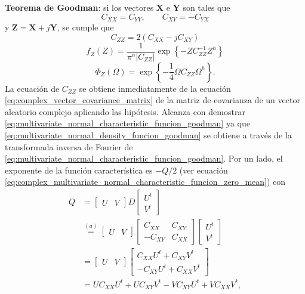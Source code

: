 \documentclass[a4paper]{report}
\newcommand{\X}{\mathbf{X}}
\newcommand{\Y}{\mathbf{Y}}
\newcommand{\Z}{\mathbf{Z}}
\begin{document}
\textbf{Teorema de Goodman}: si los vectores \(\X\) e \(\Y\) son tales que
\[
 C_{XX}=C_{YY}, \qquad C_{XY}=-C_{YX}
\]
y \(\Z=\X+j\Y\), se cumple que
\[
 C_{ZZ}=2(C_{XX}-jC_{XY})
\]
\begin{equation}\label{eq:multivariate_normal_density_funcion_goodman}
 f_Z(Z)=\frac{1}{\pi^n|C_{ZZ}|}\exp\left\{-ZC_{ZZ}^{-1}Z^h\right\}
\end{equation}
\begin{equation}\label{eq:multivariate_normal_characteristic_funcion_goodman}
 \Phi_Z(\Omega)=\exp\left\{-\frac{1}{4}\Omega C_{ZZ}\Omega^h\right\}.
\end{equation}
La ecuación de \(C_{ZZ}\) se obtiene inmediatamente de la ecuación \ref{eq:complex_vector_covariance_matrix} de la matriz de covarianza de un vector aleatorio complejo aplicando las hipótesis.
Alcanza con demostrar \ref{eq:multivariate_normal_characteristic_funcion_goodman} ya que \ref{eq:multivariate_normal_density_funcion_goodman} se obtiene a través de la transformada inversa de Fourier de \ref{eq:multivariate_normal_characteristic_funcion_goodman}. Por un lado, el exponente de la función característica es \(-Q/2\) (ver ecuación \ref{eq:complex_multivariate_normal_characteristic_funcion_zero_mean}) con 
\begin{align*}
 Q&=\begin{bmatrix}
   U & V
 \end{bmatrix}
 D
 \begin{bmatrix}
   U^t\\
   V^t
 \end{bmatrix}\\
 &\overset{(a)}{=}\begin{bmatrix}
   U & V
 \end{bmatrix}
 \begin{bmatrix}
   C_{XX} & C_{XY} \\
   -C_{XY} & C_{XX}
 \end{bmatrix}
 \begin{bmatrix}
   U^t\\
   V^t
 \end{bmatrix}\\
 &=\begin{bmatrix}
   U & V
  \end{bmatrix}
  \begin{bmatrix}
   C_{XX}U^t+C_{XY}V^t\\
   -C_{XY}U^t+C_{XX}V^t
  \end{bmatrix}\\
 &=UC_{XX}U^t+UC_{XY}V^t-VC_{XY}U^t+VC_{XX}V^t,
\end{align*}
\end{document}
